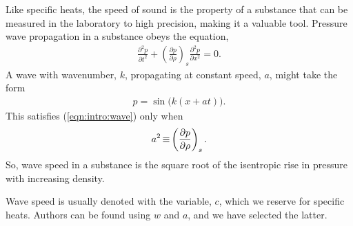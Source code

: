 Like specific heats, the speed of sound is the property of a substance that can be measured in the laboratory to high precision, making it a valuable tool.  Pressure wave propagation in a substance obeys the equation,
\begin{align}
\frac{\partial^2 p}{\partial t^2} + \left( \frac{\partial p}{\partial \rho} \right)_s \frac{\partial^2 p}{\partial x^2} = 0.\label{eqn:intro:wave}
\end{align}
A wave with wavenumber, $k$, propagating at constant speed, $a$, might take the form
\begin{align*}
p = \sin\Big(k (x + a t)\Big).
\end{align*}
This satisfies (\ref{eqn:intro:wave}) only when
\begin{align}
a^2 \operatorname*{\equiv} \left( \frac{\partial p}{\partial \rho} \right)_s.\label{eqn:intro:sound}
\end{align}
So, wave speed in a substance is the square root of the isentropic rise in pressure with increasing density.  

Wave speed is usually denoted with the variable, $c$, which we reserve for specific heats.  Authors can be found using $w$ and $a$, and we have selected the latter.  

%
% 
%

